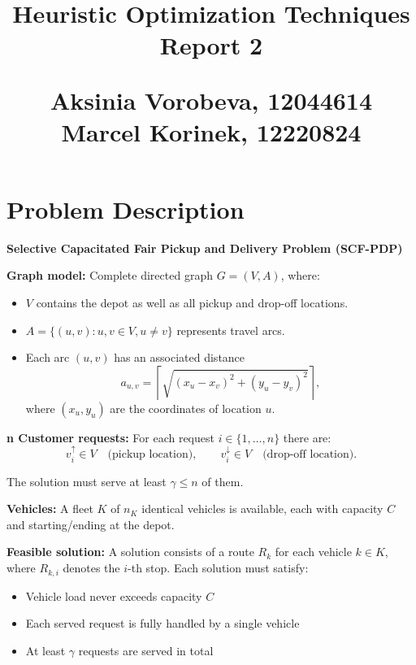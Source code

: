 \documentclass[12pt]{article}
\title{\vspace{2cm}
    \Huge \textbf{Heuristic Optimization Techniques}\\[2cm]
    \LARGE Report 2
    \vspace{10cm}
    
    \large Aksinia Vorobeva, 12044614  \\ Marcel Korinek, 12220824
    }
\begin{document}
\maketitle


\pagebreak

\section{Problem Description}
\begin{mdframed}[
    linecolor=black,
    linewidth=1.5pt,
    roundcorner=5pt,
    backgroundcolor=blue!5,
    userdefinedwidth=\textwidth,
]
\textbf{Selective Capacitated Fair Pickup and Delivery Problem (SCF-PDP)}

\vspace{0.7em}
\textbf{Graph model:}  
Complete directed graph $G = (V, A)$, where:
\begin{itemize}
    \item $V$ contains the depot as well as all pickup and drop-off locations.
    \item $A = \{(u,v) : u, v \in V, u \neq v\}$ represents travel arcs.
    \item Each arc $(u,v)$ has an associated distance  
    \[
        a_{u,v} = \left\lceil \sqrt{(x_u - x_v)^2 + (y_u - y_v)^2} \right\rceil,
    \]
    where $(x_u, y_u)$ are the coordinates of location $u$.
\end{itemize}

\vspace{0.5em}
\textbf{n Customer requests:}   
For each request $i \in \{1, \dots, n\}$ there are:
\[
v_i^{\uparrow} \in V \quad \text{(pickup location)}, \qquad
v_i^{\downarrow} \in V \quad \text{(drop-off location)}.
\]

The solution must serve at least $\gamma \le n$ of them.

\vspace{0.5em}
\textbf{Vehicles:}  
A fleet $K$ of $n_K$ identical vehicles is available, each with capacity $C$ and starting/ending at the depot.

\vspace{0.7em}
\textbf{Feasible solution:}  
A solution consists of a route $R_k$ for each vehicle $k \in K$, where $R_{k,i}$ denotes the $i$-th stop. Each solution must satisfy:
\begin{itemize}
    \item Vehicle load never exceeds capacity $C$
    \item Each served request is fully handled by a single vehicle
    \item At least $\gamma$ requests are served in total
\end{itemize}


\end{mdframed}
\end{document}

